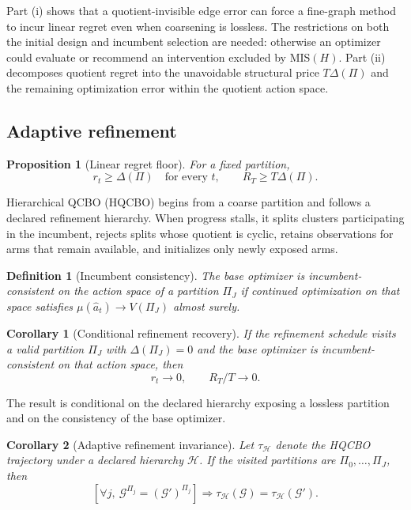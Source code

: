 \documentclass[twoside]{article}
\newtheorem{definition}{Definition}
\newtheorem{proposition}{Proposition}
\newtheorem{corollary}{Corollary}
\newcommand{\Gg}{\mathcal{G}}
\begin{document}
Part (i) shows that a quotient-invisible edge error can force a fine-graph method to incur linear regret even when coarsening is lossless. The restrictions on both the initial design and incumbent selection are needed: otherwise an optimizer could evaluate or recommend an intervention excluded by $\mathrm{MIS}(H)$. Part (ii) decomposes quotient regret into the unavoidable structural price $T\Delta(\Pi)$ and the remaining optimization error within the quotient action space.

\subsection{Adaptive refinement}
\label{sec:refinement}

\begin{proposition}[Linear regret floor]
\label{prop:floor}
For a fixed partition,
\[
 r_t\ge\Delta(\Pi)\quad\text{for every }t,
 \qquad R_T\ge T\Delta(\Pi).
\]
\end{proposition}

Hierarchical QCBO (HQCBO) begins from a coarse partition and follows a declared refinement hierarchy. When progress stalls, it splits clusters participating in the incumbent, rejects splits whose quotient is cyclic, retains observations for arms that remain available, and initializes only newly exposed arms.

\begin{definition}[Incumbent consistency]
\label{def:consistency}
The base optimizer is incumbent-consistent on the action space of a
partition $\Pi_J$ if continued optimization on that space satisfies
$\mu(\hat a_t)\to V(\Pi_J)$ almost surely.
\end{definition}

\begin{corollary}[Conditional refinement recovery]
\label{cor:recovery}
If the refinement schedule visits a valid partition $\Pi_J$ with
$\Delta(\Pi_J)=0$ and the base optimizer is incumbent-consistent on that
action space, then
\[
 r_t\longrightarrow0,
 \qquad R_T/T\longrightarrow0.
\]
\end{corollary}

The result is conditional on the declared hierarchy exposing a lossless partition and on the consistency of the base optimizer.

\begin{corollary}[Adaptive refinement invariance]
\label{cor:adaptive-invariance}
Let $\tau_{\mathcal H}$ denote the HQCBO trajectory under a declared
hierarchy $\mathcal H$. If the visited partitions are
$\Pi_0,\ldots,\Pi_J$, then
\[
 \left[\forall j,\ \Gg^{\Pi_j}=(\Gg')^{\Pi_j}\right]
 \Longrightarrow
 \tau_{\mathcal H}(\Gg)=\tau_{\mathcal H}(\Gg').
\]
\end{corollary}
\end{document}
